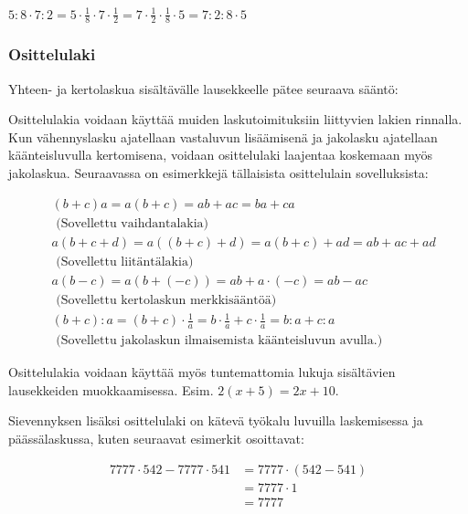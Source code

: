 \begin{esimerkki}
$5:8\cdot 7:2=5\cdot\frac18\cdot 7\cdot\frac12=7\cdot \frac12\cdot\frac18\cdot 5=7:2:8\cdot 5$
\end{esimerkki}

\subsubsection*{Osittelulaki}

Yhteen- ja kertolaskua sisältävälle lausekkeelle pätee seuraava sääntö:


Osittelulakia voidaan käyttää muiden laskutoimituksiin liittyvien lakien rinnalla. Kun vähennyslasku ajatellaan vastaluvun lisäämisenä ja jakolasku ajatellaan käänteisluvulla kertomisena, voidaan osittelulaki laajentaa koskemaan myös jakolaskua. Seuraavassa on esimerkkejä tällaisista osittelulain sovelluksista:

\begin{esimerkki}
\begin{align*}
&(b+c)a = a(b+c) = ab+ac = ba+ca \\
&\text{ (Sovellettu vaihdantalakia)} \\
&a(b+c+d) = a((b+c)+d) = a(b+c)+ad = ab+ac+ad \\
&\text{ (Sovellettu liitäntälakia)} \\
&a(b-c) = a(b+(-c))=ab+a\cdot(-c)=ab-ac \\
&\text{ (Sovellettu kertolaskun merkkisääntöä)} \\
&(b+c):a = (b+c)\cdot\frac1a = b\cdot\frac1a+c\cdot\frac1a = b:a+c:a \\
&\text{ (Sovellettu jakolaskun ilmaisemista käänteisluvun avulla.) }
\end{align*}
\end{esimerkki}

Osittelulakia voidaan käyttää myös tuntemattomia lukuja sisältävien lausekkeiden muokkaamisessa. Esim. $2(x+5)=2x+10$.

Sievennyksen lisäksi osittelulaki on kätevä työkalu luvuilla laskemisessa ja päässälaskussa, kuten seuraavat esimerkit osoittavat:

\begin{esimerkki}
     \begin{align*}
7777\cdot 542-7777\cdot 541 &= 7777\cdot (542-541) \\ &= 7777\cdot 1 \\ &= 7777
     \end{align*}
\end{esimerkki}

